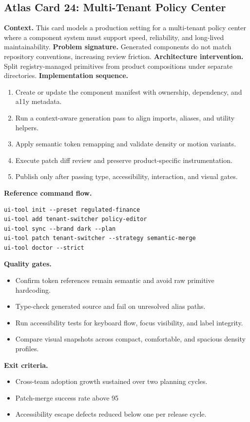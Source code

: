 \subsection*{Atlas Card 24: Multi-Tenant Policy Center}
\textbf{Context.} This card models a production setting for a multi-tenant policy center where a component system must support speed, reliability, and long-lived maintainability.
\textbf{Problem signature.} Generated components do not match repository conventions, increasing review friction.
\textbf{Architecture intervention.} Split registry-managed primitives from product compositions under separate directories.
\textbf{Implementation sequence.}
\begin{enumerate}[leftmargin=*, itemsep=0.28em]
  \item Create or update the component manifest with ownership, dependency, and a11y metadata.
  \item Run a context-aware generation pass to align imports, aliases, and utility helpers.
  \item Apply semantic token remapping and validate density or motion variants.
  \item Execute patch diff review and preserve product-specific instrumentation.
  \item Publish only after passing type, accessibility, interaction, and visual gates.
\end{enumerate}
\textbf{Reference command flow.}
\begin{verbatim}
ui-tool init --preset regulated-finance
ui-tool add tenant-switcher policy-editor
ui-tool sync --brand dark --plan
ui-tool patch tenant-switcher --strategy semantic-merge
ui-tool doctor --strict
\end{verbatim}
\textbf{Quality gates.}
\begin{itemize}[leftmargin=*, itemsep=0.24em]
  \item Confirm token references remain semantic and avoid raw primitive hardcoding.
  \item Type-check generated source and fail on unresolved alias paths.
  \item Run accessibility tests for keyboard flow, focus visibility, and label integrity.
  \item Compare visual snapshots across compact, comfortable, and spacious density profiles.
\end{itemize}
\textbf{Exit criteria.}
\begin{itemize}[leftmargin=*, itemsep=0.24em]
  \item Cross-team adoption growth sustained over two planning cycles.
  \item Patch-merge success rate above 95%
  \item Accessibility escape defects reduced below one per release cycle.
\end{itemize}
\clearpage
